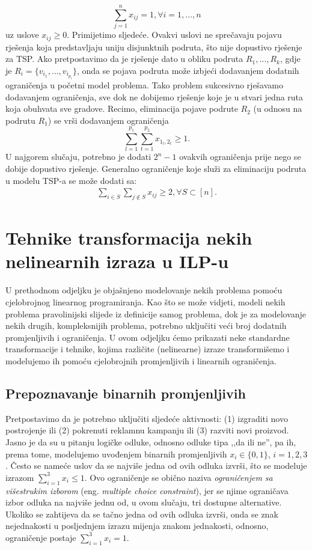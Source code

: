 \documentclass[b5paper, utf8, 11pt, colorlinks]{book}
\theoremstyle{definition}
\begin{document}
$$  \sum_{j=1}^n x_{ij} = 1, \forall i =1,\ldots, n$$ 
uz uslove $x_{ij}\geq 0$. Primijetimo sljedeće. Ovakvi uslovi ne sprečavaju pojavu rješenja koja predstavljaju uniju disjunktnih podruta, što nije dopustivo rješenje za TSP. Ako pretpostavimo da je rješenje dato u obliku podruta $R_1, \ldots, R_k$, gdje je $R_i = \{ v_{i_1}, \ldots, v_{i_{p_i}} \}$, onda se pojava podruta  može izbjeći  dodavanjem dodatnih ograničenja u početni model problema. Tako problem sukcesivno rješavamo dodavanjem ograničenja, sve dok ne dobijemo rješenje koje je u stvari jedna ruta koja obuhvata sve gradove. Recimo, eliminacija pojave podrute $R_2$ (u odnosu na podrutu $R_1$) se vrši dodavanjem ograničenja
$$ \sum_{l=1}^{ {p_1}}\sum_{t=1}^{ {p_2}} x_{1_l, 2_t} \geq 1.$$
U najgorem slučaju, potrebno je dodati $2^n-1$ ovakvih ograničenja prije nego se dobije dopustivo rješenje. 
Generalno ograničenje koje služi za eliminaciju podruta u modelu TSP-a se može dodati sa:
\begin{align}
	\sum_{i \in S} \sum_{j \notin S} x_{ij} \geq 2, \forall S \subset [n].
\end{align}

\section{Tehnike transformacija nekih nelinearnih izraza u ILP-u}\label{sec:transformILP}

U prethodnom odjeljku je objašnjeno modelovanje nekih problema pomoću cjelobrojnog linearnog programiranja. Kao što se može vidjeti, modeli nekih problema pravolinijski slijede iz definicije samog problema, dok je za modelovanje nekih drugih, kompleksnijih problema, potrebno uključiti veći broj dodatnih promjenljivih i ograničenja. U ovom odjeljku ćemo prikazati neke standardne transformacije i tehnike, kojima različite (nelinearne) izraze transformišemo i modelujemo ih pomoću cjelobrojnih promjenljivih i linearnih ograničenja.



\subsection{Prepoznavanje binarnih promjenljivih}
Pretpostavimo da je potrebno uključiti sljedeće aktivnosti: (1) izgraditi novo postrojenje ili
(2) pokrenuti reklamnu kampanju ili (3) razviti novi proizvod. Jasno je da su u pitanju logičke odluke, odnosno odluke tipa ,,da ili ne'', pa ih, prema tome, modelujemo   uvođenjem  binarnih promjenljivih $x_i \in \{0, 1 \}$, $i=1,2,3$. Često se nameće uslov da se najviše jedna od ovih odluka izvrši, što se modeluje izrazom $\sum_{i=1}^3 x_i \leq 1$. Ovo ograničenje se obično naziva \emph{ograničenjem sa višestrukim izborom} (eng. \emph{multiple choice constraint}), jer se njime ograničava izbor odluka na najviše jednu od, u ovom slučaju, tri dostupne alternative. Ukoliko se zahtijeva da se tačno jedna od ovih odluka izvrši, onda se znak nejednakosti u posljednjem izrazu mijenja znakom jednakosti, odnosno, ograničenje postaje $\sum_{i=1}^3 x_i = 1$.
\end{document}

